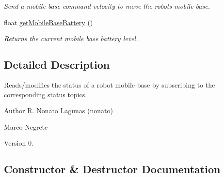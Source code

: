 \begin{DoxyCompactItemize}
\begin{DoxyCompactList}\small\item\em Send a mobile base command velocity to move the robot\textquotesingle{}s mobile base. \end{DoxyCompactList}\item 
float \hyperlink{class_mobile_base_status_afb2ffc819c33b4f5fc28e4808322297e}{get\+Mobile\+Base\+Battery} ()
\begin{DoxyCompactList}\small\item\em Returns the current mobile base battery level. \end{DoxyCompactList}\end{DoxyCompactItemize}


\subsection{Detailed Description}
Reads/modifies the status of a robot mobile base by subscribing to the corresponding status topics. 

\begin{DoxyAuthor}{Author}
R. Nonato Lagunas (nonato) 

Marco Negrete 
\end{DoxyAuthor}
\begin{DoxyVersion}{Version}
0. 
\end{DoxyVersion}


\subsection{Constructor \& Destructor Documentation}
